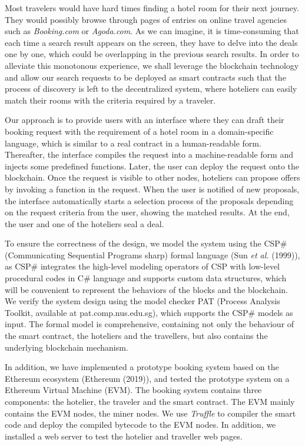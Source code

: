 \documentclass{KERauth}
\begin{document}
Most travelers would have hard times finding a hotel room for their next journey. They would possibly
browse through pages of entries on online travel agencies such as \emph{Booking.com} or \emph{Agoda.com}. As
we can imagine, it is time-consuming that each time a search result appears on the screen, they have to
delve into the deals one by one, which could be overlapping in the previous search results. In order to alleviate
this monotonous experience, we shall leverage the blockchain technology and allow our search requests to
be deployed as smart contracts such that the process of discovery is left to the decentralized system, where
hoteliers can easily match their rooms with the criteria required by a traveler.

Our approach is to provide users with an interface where they can draft their booking request with the
requirement of a hotel room in a domain-specific language, which is similar to a real contract in a human-readable form. Thereafter, the interface compiles the request into a machine-readable form and injects some
predefined functions. Later, the user can deploy the request onto the blockchain. Once the request is visible
to other nodes, hoteliers can propose offers by invoking a function in the request. When the user is notified
of new proposals, the interface automatically starts a selection process of the proposals depending on the
request criteria from the user, showing the matched results. At the end, the user and one of the hoteliers seal
a deal.

To ensure the correctness of the design, we model the system using the CSP\# (Communicating Sequential Programs sharp) formal language (Sun {\it et al.} (1999)), as CSP\# integrates the high-level modeling operators of CSP with low-level procedural codes in C\# language and supports custom data structures, which will be convenient to represent the behaviors of the blocks and the blockchain. We verify the system design using the model checker PAT (Process Analysis Toolkit, available at pat.comp.nus.edu.sg), which supports the CSP\# models as input. The formal model is comprehensive, containing not only the behaviour of the smart contract, the hoteliers and the travellers, but also contains the underlying blockchain mechanism. 

In addition, we have implemented a prototype booking system based on the Ethereum ecosystem (Ethereum (2019)), and tested the prototype system on a Ethereum Virtual Machine (EVM). The booking system contains three components: the hotelier, the traveler and the smart contract. The EVM mainly contains the EVM nodes, the miner nodes. We use \emph{Truffle} to compiler the smart code and deploy the compiled bytecode to the EVM nodes. In addition, we installed a web server to test the hotelier and traveller web pages. 
\end{document}
